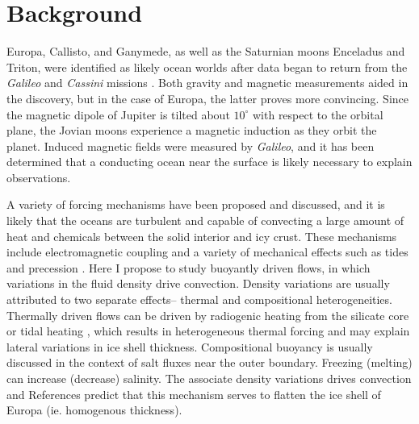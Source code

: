 \documentclass{article}
\begin{document}
\section{Background}
Europa, Callisto, and Ganymede, as well as the Saturnian moons Enceladus and Triton, were identified as likely ocean worlds after data began to return from the \textit{Galileo} and \textit{Cassini} missions \citep{fN16}.
Both gravity and magnetic measurements aided in the discovery, but in the case of Europa, the latter proves more convincing. 
Since the magnetic dipole of Jupiter is tilted about $10^{\circ}$ with respect to the orbital plane, the Jovian moons experience a magnetic induction as they orbit the planet.
Induced magnetic fields were measured by \textit{Galileo}, and it has been determined that a conducting ocean near the surface is likely necessary to explain observations\citep{fN16,cZ00}. 

A variety of forcing mechanisms have been proposed and discussed, and it is likely that the oceans are turbulent and capable of convecting a large amount of heat and chemicals between the solid interior and icy crust.
These mechanisms include electromagnetic coupling\citep{cGlP19} and a variety of mechanical effects such as tides and precession \citep{kS24}. 
Here I propose to study buoyantly driven flows, in which variations in the fluid density drive convection.
Density variations are usually attributed to two separate effects-- thermal and compositional heterogeneities.
Thermally driven flows can be driven by radiogenic heating from the silicate core \citep{kS14,kS19,jK22} or tidal heating \citep{gT03,dL23}, which results in heterogeneous thermal forcing and may explain lateral variations in ice shell thickness. 
Compositional buoyancy is usually discussed in the context of salt fluxes near the outer boundary. 
Freezing (melting) can increase (decrease) salinity. The associate density variations drives convection and References \citep{yA21,wK22} predict that this mechanism serves to flatten the ice shell of Europa (ie.  homogenous thickness). 
\end{document}
